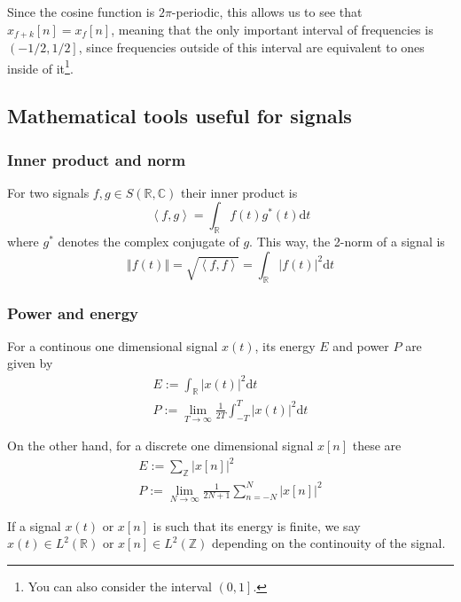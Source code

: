 \documentclass[12pt]{article}
\newcommand{\dd}{\mathrm{d}}
\begin{document}
Since the cosine function is $2\pi$-periodic, this allows us to see that $x_{f + k}[n] = x_f[n]$, meaning that the only important interval of frequencies is $\left (-1/2, 1/2\right ]$, since frequencies outside of this interval are equivalent to ones inside of it\footnote{You can also consider the interval $\left (0, 1\right ]$.}.

\subsection{Mathematical tools useful for signals}
\subsubsection{Inner product and norm}
For two signals $f, g\in S\left (\mathbb{R}, \mathbb{C}\right )$ their inner product is
\begin{equation}
\left <f, g\right > = \int_{\mathbb{R}}f(t)g^*(t)\dd t
\end{equation}
where $g^*$ denotes the complex conjugate of $g$. This way, the 2-norm of a signal is
\begin{equation}
\left \Vert f(t)\right \Vert = \sqrt{\left <f, f\right >} = \int_{\mathbb{R}}\left |f(t)\right |^2\dd t
\end{equation}

\subsubsection{Power and energy}
For a continous one dimensional signal $x(t)$, its energy $E$ and power $P$ are given by
\begin{gather}
E := \int_{\mathbb{R}}\left |x(t)\right |^2\dd t \\
P := \lim_{T\rightarrow\infty}\frac{1}{2T}\int_{-T}^T\left |x(t)\right |^2\dd t
\end{gather}

On the other hand, for a discrete one dimensional signal $x[n]$ these are
\begin{gather}
E := \sum_{\mathbb{Z}}\left |x[n]\right |^2 \\
P := \lim_{N\rightarrow\infty}\frac{1}{2N + 1}\sum_{n=-N}^N\left |x[n]\right |^2
\end{gather}

If a signal $x(t)$ or $x[n]$ is such that its energy is finite, we say $x(t)\in L^2\left (\mathbb{R}\right )$ or $x[n]\in L^2\left (\mathbb{Z}\right )$ depending on the continouity of the signal.
\end{document}
